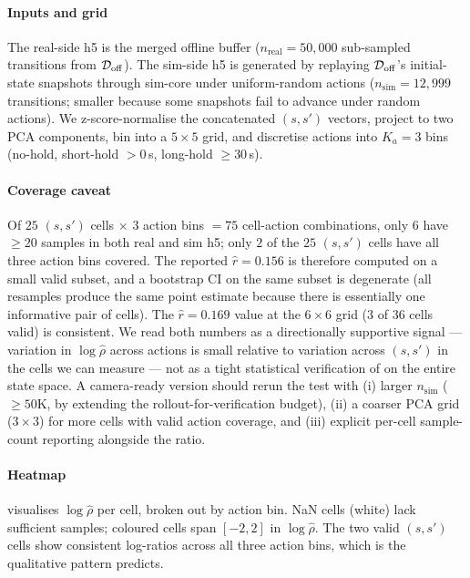 \paragraph{Inputs and grid}
The real-side h5 is the merged offline buffer ($n_{\text{real}} = 50{,}000$ sub-sampled transitions from $\mathcal{D}_{\mathrm{off}}$).
The sim-side h5 is generated by replaying $\mathcal{D}_{\mathrm{off}}$'s initial-state snapshots through sim-core under uniform-random actions ($n_{\text{sim}} = 12{,}999$ transitions; smaller because some snapshots fail to advance under random actions).
We z-score-normalise the concatenated $(s, s')$ vectors, project to two PCA components, bin into a $5 \times 5$ grid, and discretise actions into $K_a = 3$ bins (no-hold, short-hold $> 0$\,s, long-hold $\geq 30$\,s).

\paragraph{Coverage caveat}
Of $25$ $(s, s')$ cells $\times$ $3$ action bins $= 75$ cell-action combinations, only $6$ have $\geq 20$ samples in both real and sim h5; only $2$ of the $25$ $(s, s')$ cells have all three action bins covered.
The reported $\hat{r} = 0.156$ is therefore computed on a small valid subset, and a bootstrap CI on the same subset is degenerate (all resamples produce the same point estimate because there is essentially one informative pair of cells).
The $\hat{r} = 0.169$ value at the $6 \times 6$ grid (3 of 36 cells valid) is consistent.
We read both numbers as a directionally supportive signal --- variation in $\log \hat\rho$ across actions is small relative to variation across $(s, s')$ in the cells we can measure --- not as a tight statistical verification of  on the entire state space.
A camera-ready version should rerun the test with (i) larger $n_{\text{sim}}$ ($\geq 50$K, by extending the rollout-for-verification budget), (ii) a coarser PCA grid ($3 \times 3$) for more cells with valid action coverage, and (iii) explicit per-cell sample-count reporting alongside the ratio.

\paragraph{Heatmap}
 visualises $\log \hat\rho$ per cell, broken out by action bin.
NaN cells (white) lack sufficient samples; coloured cells span $[-2, 2]$ in $\log \hat\rho$.
The two valid $(s, s')$ cells show consistent log-ratios across all three action bins, which is the qualitative pattern  predicts.

